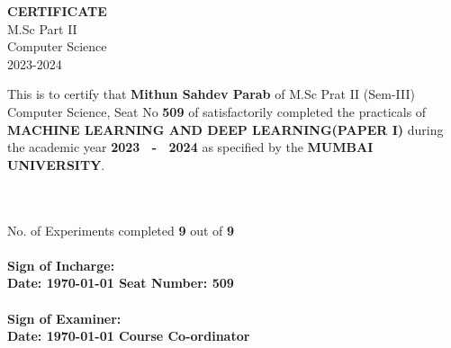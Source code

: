 \begin{center}

    \end{center}
    \begin{center}
    \textbf{ \uppercase{ \Large{CERTIFICATE} \\}}
     \hspace{0.22cm} M.Sc Part II \\
    \hspace{0.22cm} Computer Science \\
    \hspace{0.22cm} 2023-2024 \\
    \end{center}
    \vspace{1cm}
    \begin{center}
            \begin{minipage}{42em}
    \hspace{1.5cm} This is to certify that \textbf{Mithun Sahdev Parab} of M.Sc Prat II (Sem-III) Computer Science, Seat No \textbf{509} of satisfactorily completed the practicals of \textbf{\uppercase{Machine learning and Deep learning(Paper I)}} during the academic year \textbf{2023 \ - \ 2024} as specified by the \textbf{\uppercase{Mumbai University}}.
    \end{minipage}
    \end{center}
\hspace{0.7cm}
\\\\
No. of Experiments completed \hspace{0.25cm} \textbf{9} \hspace{0.25cm} out of \hspace{0.25cm} \textbf{9} \hspace{0.25cm}
    \\\\
    \textbf{
    Sign of Incharge: \\
    \hspace{1.5cm}Date: \today        \hspace{5.6cm} \textbf{Seat Number: 509}
    \\\\
    Sign of Examiner: \\
    \hspace{1.5cm}Date:  \today			\hspace{5.5cm}			 Course Co-ordinator}
    
